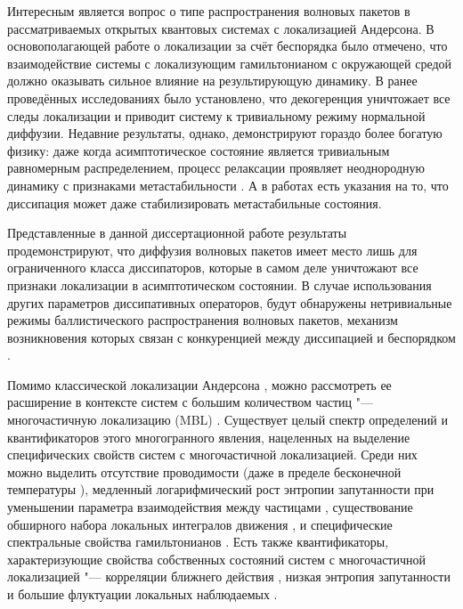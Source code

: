 Интересным является вопрос о типе распространения волновых пакетов в рассматриваемых открытых квантовых системах с локализацией Андерсона.
В основополагающей работе о локализации за счёт беспорядка \autocite{Anderson1958} было отмечено, что взаимодействие системы с локализующим гамильтонианом с окружающей средой должно оказывать сильное влияние на результирующую динамику. 
В ранее проведённых исследованиях \autocite{Gurvitz2000, Nowak2012, Flores1999} было установлено, что декогеренция уничтожает все следы локализации и приводит систему к тривиальному режиму нормальной диффузии.
Недавние результаты, однако, демонстрируют гораздо более богатую физику: даже когда асимптотическое состояние является тривиальным равномерным распределением, процесс релаксации проявляет неоднородную динамику с признаками метастабильности \autocite{Genway2014}. А в работах \autocite{Valenti2015, Spagnolo2015, Spagnolo2016} есть указания на то, что диссипация может даже стабилизировать метастабильные состояния.

Представленные в данной диссертационной работе результаты продемонстрируют, что диффузия волновых пакетов имеет место лишь для ограниченного класса диссипаторов, которые в самом деле уничтожают все признаки локализации в асимптотическом состоянии.
В случае использования других параметров диссипативных операторов, будут обнаружены нетривиальные режимы баллистического распространения волновых пакетов, механизм возникновения которых связан с конкуренцией между
диссипацией и беспорядком \cite{Yusipov2018}.

Помимо классической локализации Андерсона \autocite{Anderson1958}, можно рассмотреть ее расширение в контексте систем с большим количеством частиц "--- многочастичную локализацию (MBL) \autocite{Gornyi2005, Basko2006}.
Существует целый спектр определений и квантификаторов этого многогранного явления, нацеленных на выделение специфических свойств систем с многочастичной локализацией.
Среди них можно выделить отсутствие проводимости \autocite{Gornyi2005} (даже в пределе бесконечной температуры \autocite{Basko2006}), медленный логарифмический рост энтропии запутанности при уменьшении параметра взаимодействия между частицами \autocite{Chiara2006, Znidaric2008, Bardarson2012, Serbyn2013_1}, существование обширного набора локальных интегралов движения \autocite{Serbyn2013_2}, и специфические спектральные свойства гамильтонианов \autocite{Oganesyan2007, Serbyn2016}.
Есть также квантификаторы, характеризующие свойства собственных состояний систем с многочастичной локализацией "--- корреляции ближнего действия \autocite{Pal2010}, низкая энтропия запутанности \autocite{Bauer2013, Kjll2014, Khemani2017} и большие флуктуации локальных наблюдаемых \autocite{Bera2015}.

